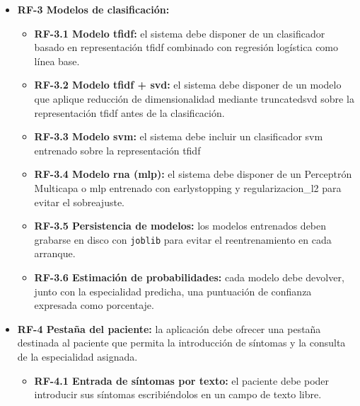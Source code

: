 \begin{itemize}
\begin{itemize}
		\item \textbf{RF-2.3 Reducción morfológica (\gls{stemming}):} se debe aplicar el algoritmo Snowball para español sobre los \textit{tokens} resultantes.
		\item \textbf{RF-2.4 Generación de n-gramas:} la vectorización debe generar al menos unigramas (palabras sueltas) y bigramas (pares de palabras consecutivas), para reconocer expresiones clínicas como ``dolor torácico'' o ``falta de aire''.
		\item \textbf{RF-2.5 Coherencia entrenamiento/predicción:} el preprocesado aplicado al texto introducido debe ser el mismo que el utilizado durante el entrenamiento.
	\end{itemize}
	\item \textbf{RF-3 Modelos de clasificación:} 
	\begin{itemize}
		\item \textbf{RF-3.1 Modelo \gls{tfidf}:} el sistema debe disponer de un clasificador basado en representación \gls{tfidf} combinado con regresión logística como línea base.
		\item \textbf{RF-3.2 Modelo \gls{tfidf} + \gls{svd}:} el sistema debe disponer de un modelo que aplique reducción de dimensionalidad mediante \gls{truncatedsvd} sobre la representación \gls{tfidf} antes de la clasificación.
		\item \textbf{RF-3.3 Modelo \gls{svm}:} el sistema debe incluir un clasificador \gls{svm} entrenado sobre la representación \gls{tfidf}
		\item \textbf{RF-3.4 Modelo \gls{rna} (\gls{mlp}):} el sistema debe disponer de un Perceptrón Multicapa o \gls{mlp} entrenado con \gls{earlystopping} y \gls{regularizacion_l2} para evitar el sobreajuste.
		\item \textbf{RF-3.5 Persistencia de modelos:} los modelos entrenados deben grabarse en disco con \texttt{joblib} para evitar el reentrenamiento en cada arranque.
		\item \textbf{RF-3.6 Estimación de probabilidades:} cada modelo debe devolver, junto con la especialidad predicha, una puntuación de confianza expresada como porcentaje.
	\end{itemize}
	\item \textbf{RF-4 Pestaña del paciente:} la aplicación debe ofrecer una pestaña destinada al paciente que permita la introducción de síntomas y la consulta de la especialidad asignada.
	\begin{itemize}
		\item \textbf{RF-4.1 Entrada de síntomas por texto:} el paciente debe poder introducir sus síntomas escribiéndolos en un campo de texto libre.

\end{itemize}
\end{itemize}
